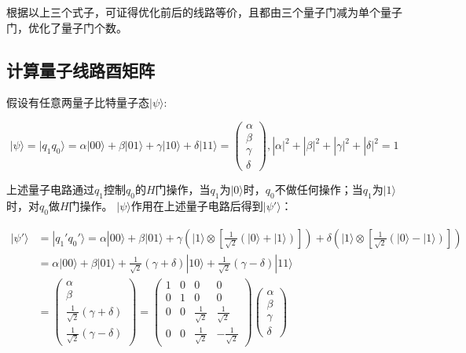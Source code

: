 \documentclass[12pt]{article}
\begin{document}
根据以上三个式子，可证得优化前后的线路等价，且都由三个量子门减为单个量子门，优化了量子门个数。

\subsection{计算量子线路酉矩阵}
假设有任意两量子比特量子态$|\psi\rangle$:

\[
|\psi\rangle = |q_1q_0\rangle = \alpha|00\rangle + \beta|01\rangle + \gamma|10\rangle + \delta|11\rangle = \begin{pmatrix} \alpha \\ \beta \\ \gamma \\ \delta \end{pmatrix}, | \alpha\vert ^2+ | \beta\vert ^2+| \gamma\vert^2+| \delta\vert^2=1
\]

\begin{center}
\end{center}
    
上述量子电路通过$q_1$控制$q_0$的$H$门操作，当$q_1$为$|0\rangle$时，$q_0$不做任何操作；当$q_1$为$|1\rangle$时，对$q_0$做$H$门操作。
$|\psi\rangle$作用在上述量子电路后得到$|\psi'\rangle$：

\begin{align*}
    |\psi'\rangle &= |q_1'q_0'\rangle 
    = \alpha|00\rangle + \beta|01\rangle + 
    \gamma \left( |1\rangle \otimes \left[ \frac{1}{\sqrt{2}} \left( |0\rangle + |1\rangle \right) \right] \right)
    + \delta \left( |1\rangle \otimes \left[ \frac{1}{\sqrt{2}} \left( |0\rangle - |1\rangle \right) \right] \right) \\    
    &= \alpha|00\rangle + \beta|01\rangle + \frac{1}{\sqrt{2}}(\gamma+\delta)|10\rangle + \frac{1}{\sqrt{2}}(\gamma-\delta)|11\rangle \\
    &= \begin{pmatrix} \alpha \\ \beta \\ \frac{1}{\sqrt{2}}(\gamma+\delta) \\ \frac{1}{\sqrt{2}}(\gamma-\delta) \end{pmatrix}
    = \begin{pmatrix}1 & 0 & 0 & 0 \\ 0 & 1 & 0 & 0 \\ 0 & 0 & \frac{1}{\sqrt{2}} & \frac{1}{\sqrt{2}} \\ 0 & 0 & \frac{1}{\sqrt{2}} & -\frac{1}{\sqrt{2}}\end{pmatrix}
    \begin{pmatrix} \alpha \\ \beta \\ \gamma \\ \delta \end{pmatrix}
\end{align*}
\end{document}
